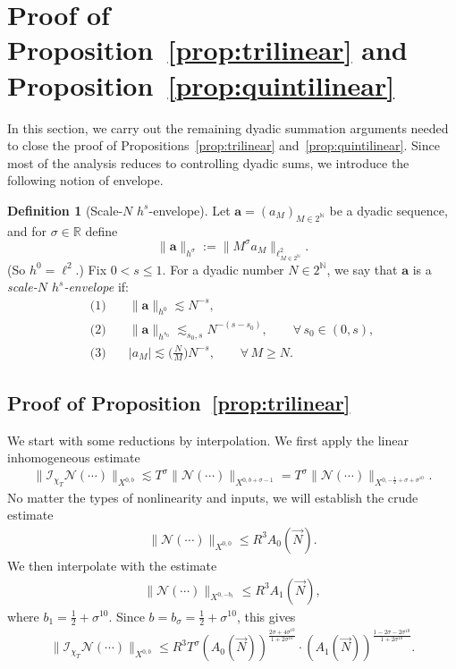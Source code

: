 \documentclass[11pt,reqno,english]{amsart}
\numberwithin{equation}{section}
\theoremstyle{plain}
\theoremstyle{definition}
\newtheorem{definition}[theorem]{Definition}
\theoremstyle{remark}
\begin{document}
	
	\section{Proof of Proposition~\ref{prop:trilinear} and Proposition~\ref{prop:quintilinear}}\label{sec:mainproof}

In this section, we carry out the remaining dyadic summation arguments needed to close the proof of Propositions~\ref{prop:trilinear} and~\ref{prop:quintilinear}.
Since most of the analysis reduces to controlling dyadic sums, we introduce the following notion of envelope.


\begin{definition}[Scale-$N$ $h^{s}$-envelope]\label{def:scale-seq}
	Let $\mathbf{a}=(a_M)_{M\in 2^{\mathbb N}}$ be a dyadic sequence, and for $\sigma\in\mathbb R$ define
	\[
	\|\mathbf{a}\|_{h^{\sigma}} := \bigl\| M^{\sigma} a_M \bigr\|_{\ell^2_{M\in 2^{\mathbb N}}}.
	\]
	(So $h^0=\ell^2$.) Fix $0<s\leq 1$. For a dyadic number $N\in 2^{\mathbb N}$, we say that $\mathbf{a}$ is a \emph{scale-$N$ $h^{s}$-envelope} if:
	\begin{align*}
		\text{(1)}\quad & \|\mathbf{a}\|_{h^0} \lesssim N^{-s},\\
		\text{(2)}\quad & \|\mathbf{a}\|_{h^{s_0}} \lesssim_{s_0,s} N^{-(s-s_0)},\qquad \forall\, s_0\in(0,s),\\
		\text{(3)}\quad & |a_M|\lesssim \Big(\frac{N}{M}\Big) N^{-s},\qquad \forall\, M\ge N.
	\end{align*}
\end{definition}


\subsection{Proof of Proposition~\ref{prop:trilinear}}


We start with some reductions by interpolation.
We first apply the linear inhomogeneous estimate
\begin{align*}
	\|\mathcal{I}_{\chi_T}\mathcal{N}(\cdots)\|_{X^{0,b}}\lesssim T^{\sigma}\|\mathcal{N}(\cdots)\|_{X^{0,b+\sigma-1}}=T^{\sigma}\|\mathcal{N}(\cdots)\|_{X^{0,-\frac{1}{2}+\sigma+\sigma^{10}}}.
\end{align*}
No matter the types of nonlinearity and inputs, we will establish the crude estimate
\begin{align}\label{algorithm:A_0}
	\|\mathcal{N}(\cdots)\|_{X^{0,0}}\leq R^3 A_0(\vec{N}).
\end{align}
We then interpolate with the estimate
\begin{align}\label{algorithm:A_1}
	\|\mathcal{N}(\cdots)\|_{X^{0,-b_1}}\leq R^3 A_1(\vec{N}),
\end{align}
where $b_1=\frac{1}{2}+\sigma^{10}$.
Since $b=b_{\sigma}=\frac{1}{2}+\sigma^{10}$, this gives
\begin{align}\label{algorithm:output}
	\|\mathcal{I}_{\chi_T}\mathcal{N}(\cdots)\|_{X^{0,b}}\leq R^3 T^{\sigma}(A_0(\vec{N}))^{\frac{2\sigma+4\sigma^{10}}{1+2\sigma^{10}}} \cdot (A_1(\vec{N}))^{\frac{1-2\sigma-2\sigma^{10}}{1+2\sigma^{10}}}.
\end{align}
\end{document}
